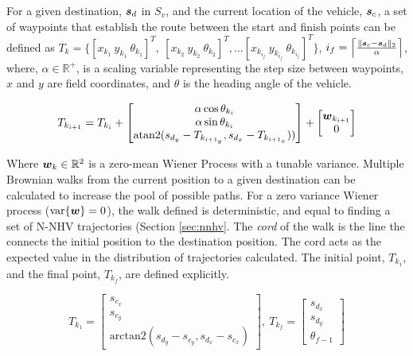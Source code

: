 For a given destination, ${\it{\boldsymbol{s}}}_d$ in $S_{v}$, and the current location of the vehicle, ${\it{\boldsymbol{s}}}_{c}$, a set of waypoints that establish the route between the start and finish points can be defined as $T_k = \Big\{[x_{k_1}\ y_{k_1}\ \theta_{k_1}]^T,\ [x_{k_2}\ y_{k_2}\ \theta_{k_2}]^T, \dots [x_{k_{i_f}}\ y_{k_{i_f}}\ \theta_{k_{i_f}}]^T \Big\}$, $i_f = \Big\lceil \frac{\|{\it{\boldsymbol{s}}}_c - {\it{\boldsymbol{s}}}_d\|_2}{\alpha} \Big\rceil$, where, $\alpha \in \mathbb{R}^{+}$, is a scaling variable representing the step size between waypoints, $x$ and $y$ are field coordinates, and $\theta$ is the heading angle of the vehicle. 

\begin{equation}
	T_{k_{i + 1}} = T_{k_i} +
	\begin{bmatrix}
		\alpha \cos \theta_{k_i} \\
		\alpha \sin \theta_{k_i} \\
		\text{atan2}(s_{d_y} - T_{k_{{i+1}_y}}, s_{d_x} - T_{k_{{i+1}_x}}))
	\end{bmatrix} + \begin{bmatrix} 
		{\it{\boldsymbol{w}}}_{k_{i+1}} \\
		0
	\end{bmatrix}
\end{equation}

Where ${\it{\boldsymbol{w}}}_k \in \mathbb{R}^2$ is a zero-mean Wiener Process with a tunable variance. Multiple Brownian walks from the current position to a given destination can be calculated to increase the pool of possible paths. For a zero variance Wiener process ($\text{var}\{{\it{\boldsymbol{w}}}\}=0$), the walk defined is deterministic, and equal to finding a set of N-NHV trajectories (Section \ref{sec:nnhv}. The \textit{cord} of the walk is the line the connects the initial position to the destination position. The cord acts as the expected value in the distribution of trajectories calculated. The initial point, $T_{k_1}$, and the final point, $T_{k_f}$, are defined explicitly.

\begin{equation}
	T_{k_1} = \begin{bmatrix}
		s_{c_x} \\
		s_{c_y} \\
		\text{arctan2}(s_{d_y} - s_{c_y}, s_{d_x} - s_{c_x})
	\end{bmatrix},\ 
	T_{k_f} = \begin{bmatrix}
		s_{d_x} \\
		s_{d_y} \\
		\theta_{f-1}
	\end{bmatrix}
\end{equation}

